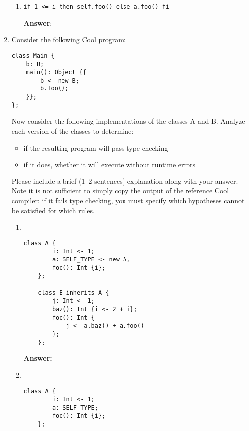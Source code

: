 \documentclass[11pt]{article}
\begin{document}
\begin{enumerate}
\begin{enumerate}
    \item \lstinline[keepspaces=true, emph={a,i}]{if 1 <= i then self.foo() else a.foo() fi}

        \textbf{Answer}:
\end{enumerate}

\newpage

\item Consider the following Cool program:
\begin{lstlisting}[emph={b}, basicstyle=\small]
class Main {
    b: B;
    main(): Object {{
        b <- new B;
        b.foo();
    }};
};
\end{lstlisting}
Now consider the following implementations of the classes A and B. Analyze each version of the classes to determine:
\begin{itemize}
    \item if the resulting program will pass type checking
    \item if it does, whether it will execute without runtime errors
\end{itemize}
Please include a brief (1--2 sentences) explanation along with your answer.  Note it is not sufficient to simply copy the output of the reference Cool compiler: if it fails type checking, you must specify which hypotheses cannot be satisfied for which rules.

\begin{enumerate}
    \item ~\\
    \begin{minipage}{2.4in}
    \begin{lstlisting}[gobble=4, emph={i,j,a}, basicstyle=\small]
    class A {
        i: Int <- 1;
        a: SELF_TYPE <- new A;
        foo(): Int {i};
    };

    class B inherits A {
        j: Int <- 1;
        baz(): Int {i <- 2 + i};
        foo(): Int {
            j <- a.baz() + a.foo()
        };
    };
    \end{lstlisting}
    \end{minipage}%
    \begin{minipage}{\linewidth-2.4in}
    \textbf{Answer:}
    \end{minipage}

    \item ~\\
    \begin{minipage}{2.4in}
    \begin{lstlisting}[gobble=4, emph={i,j,a}, basicstyle=\small]
    class A {
        i: Int <- 1;
        a: SELF_TYPE;
        foo(): Int {i};
    };


\end{lstlisting}
\end{minipage}
\end{enumerate}
\end{enumerate}
\end{document}

